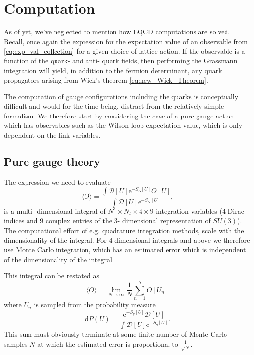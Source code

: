 \documentclass[a4paper,10pt]{book}
\begin{document}
\chapter{Computation}\label{chap:comp}
As of yet, we've neglected to mention how LQCD computations are solved. Recall, once again the expression for the expectation value of an observable from \eqref{eq:exp_val_collection} for a given choice of lattice action. If the observable is a function of the quark- and anti- quark fields, then performing the Grassmann integration will yield, in addition to the fermion determinant, any quark propagators arising from Wick's theorem \eqref{eq:new_Wick_Theorem}. \par The computation of gauge configurations including the quarks is conceptually difficult and would for the time being, distract from the relatively simple formalism. We therefore start by considering the case of a pure gauge action which has observables such as the Wilson loop expectation value, which is only dependent on the link variables.
\section{Pure gauge theory}
The expression we need to evaluate 
\begin{equation}
\langle O\rangle=\frac{\int \mathcal{D}[U] \mathrm{e}^{-S_{G}[U]} O[U]}{\int \mathcal{D}[U] \mathrm{e}^{-S_{G}[U]}}  ,
\end{equation}
is a multi- dimensional integral of $N^3\times N_t \times 4 \times 9$ integration variables (4 Dirac indices and 9 complex entries of the 3- dimensional representation of $SU(3)$). The computational effort of e.g. quadrature integration methods, scale with the dimensionality of the integral. For 4-dimensional integrals and above we therefore use Monte Carlo integration, which has an estimated error which is independent of the dimensionality of the integral.

This integral can be restated as 
\begin{equation}\label{eq:MC_gauge_sum}
\langle O\rangle=\lim _{N \rightarrow \infty} \frac{1}{N} \sum_{n=1}^{N} O\left[U_{n}\right]
\end{equation}
where $U_{n}$ is sampled from the probability measure
\begin{equation}\label{eq:prob_measure}
\mathrm{d} P(U)=\frac{\mathrm{e}^{-S_g[U]} \mathcal{D}[U]}{\int \mathcal{D}[U] \mathrm{e}^{-S_g[U]}}.
\end{equation}
This sum must obviously terminate at some finite number of Monte Carlo samples $N$ at which the estimated error is proportional to $\frac{1}{\sqrt{N}}$.
\end{document}
